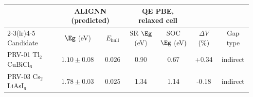 \begin{tabular}{@{}lcccccc@{}}\toprule
 & \multicolumn{2}{c}{ALIGNN (predicted)} & \multicolumn{2}{c}{QE PBE, relaxed cell} & & \\
\cmidrule(lr){2-3}\cmidrule(lr){4-5}
 Candidate & $\Eg$ (eV) & $E_\mathrm{hull}$ & SR $\Eg$ (eV) & SOC $\Eg$ (eV) & $\Delta V$ (\%) & Gap type\\\midrule
PRV-01 Tl$_2$CuBiCl$_6$ & $1.10\pm0.08$ & $0.026$ & 0.90 & 0.67 & +0.34 & indirect \\
PRV-03 Cs$_2$LiAsI$_6$ & $1.78\pm0.03$ & $0.025$ & 1.34 & 1.14 & -0.18 & indirect \\
\bottomrule\end{tabular}
